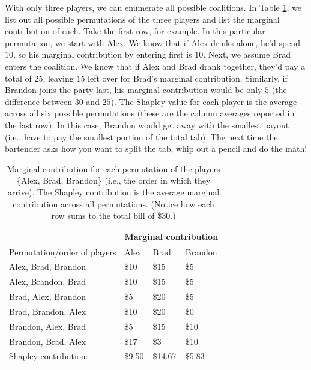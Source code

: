 With only three players, we can enumerate all possible coalitions. In
Table \ref{tab:bar}, we list out all possible permutations of the three
players and list the marginal contribution of each. Take the first row,
for example. In this particular permutation, we start with Alex. We know
that if Alex drinks alone, he'd spend \(10\), so his marginal
contribution by entering first is \(10\). Next, we assume Brad enters
the coalition. We know that if Alex and Brad drank together, they'd pay
a total of \(25\), leaving \(15\) left over for Brad's marginal
contribution. Similarly, if Brandon joins the party last, his marginal
contribution would be only \(5\) (the difference between \(30\) and
\(25\)). The Shapley value for each player is the average across all six
possible permutations (these are the column averages reported in the
last row). In this case, Brandon would get away with the smallest payout
(i.e., have to pay the smallest portion of the total tab). The next time
the bartender asks how you want to split the tab, whip out a pencil and
do the math!

\begin{table}[!htb]
\centering
\begin{tabular}{@{}llll@{}}
\toprule
                      & \multicolumn{3}{l}{Marginal contribution} \\ \midrule
Permutation/order of players           & Alex        & Brad         & Brandon      \\ \midrule
Alex, Brad, Brandon   & \$10        & \$15         & \$5          \\ 
Alex, Brandon, Brad   & \$10        & \$15         & \$5          \\
Brad, Alex, Brandon   & \$5         & \$20         & \$5          \\
Brad, Brandon, Alex   & \$10        & \$20         & \$0          \\
Brandon, Alex, Brad   & \$5         & \$15         & \$10         \\
Brandon, Brad, Alex   & \$17        & \$3          & \$10         \\ \midrule
Shapley contribution: & \$9.50      & \$14.67      & \$5.83       \\ \bottomrule
\end{tabular}
\caption{Marginal contribution for each permutation of the players \{Alex, Brad, Brandon\} (i.e., the order in which they arrive). The Shapley contribution is the average marginal contribution across all permutations. (Notice how each row sums to the total bill of \$30.) \label{tab:bar}}
\end{table}

